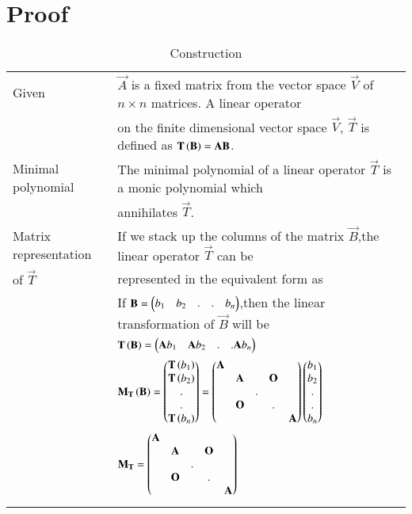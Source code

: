 \documentclass[journal,12pt]{IEEEtran}
\begin{document}
\section{Proof}
\renewcommand{\thetable}{1}
\begin{longtable}{|l|l|}
    \hline
        Given &  $\vec{A}$ is a fixed matrix from the vector space $\vec{V}$ of $n\times n$ matrices. A linear operator \\
        &on the finite dimensional vector space $\vec{V}$, $\vec{T}$ is defined as $\mathbf{T\left(B\right)}=\mathbf{AB}$.\\
    \hline
        Minimal polynomial & The minimal polynomial of a linear operator $\vec{T}$ is a monic polynomial which \\
        &annihilates $\vec{T}$.\\
    \hline
        Matrix representation & If we stack up the columns of the matrix $\vec{B}$,the linear operator $\vec{T}$ can be \\
        of $\vec{T}$ & represented in the equivalent form as \\
        & If $\mathbf{B}=\begin{pmatrix}b_1&b_2&.&.&b_n\end{pmatrix}$,then the linear transformation of $\vec{B}$ will be\\
        &$\mathbf{T\left(B\right)}=\begin{pmatrix}\mathbf{A}b_1&\mathbf{A}b_2&.&.\mathbf{A}b_n\end{pmatrix}$\\
        & $\mathbf{M_T\left(B\right)}=\begin{pmatrix}\mathbf{T}\left(b_1\right)\\\mathbf{T}\left(b_2\right)\\.\\.\\\mathbf{T}\left(b_n\right)\end{pmatrix}=\begin{pmatrix}\mathbf{A}&&&&\\&\mathbf{A}&&\mathbf{O}&\\&&.&&\\&\mathbf{O}&&.&\\&&&&\mathbf{A}\end{pmatrix}\begin{pmatrix}b_1\\b_2\\.\\.\\b_n\end{pmatrix}$\\
    \hline
        & $\mathbf{M_T}=\begin{pmatrix}\mathbf{A}&&&&\\&\mathbf{A}&&\mathbf{O}&\\&&.&&\\&\mathbf{O}&&.&\\&&&&\mathbf{A}\end{pmatrix}$\\
    \hline
    \caption{Construction}
    \label{tab:construction}
\end{longtable}
\renewcommand{\thetable}{2}
\end{document}
